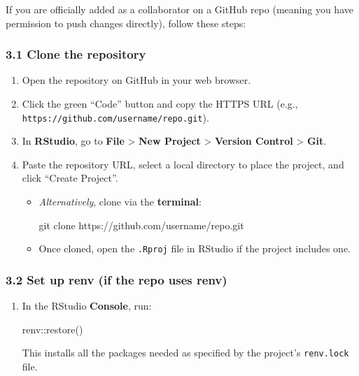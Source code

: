 \documentclass[
  letterpaper,
  DIV=11,
  numbers=noendperiod]{scrartcl}
\newenvironment{Shaded}{\begin{snugshade}}{\end{snugshade}}
\newcommand{\FunctionTok}[1]{\textcolor[rgb]{0.28,0.35,0.67}{#1}}
\newcommand{\NormalTok}[1]{\textcolor[rgb]{0.00,0.23,0.31}{#1}}
\newcommand{\SpecialCharTok}[1]{\textcolor[rgb]{0.37,0.37,0.37}{#1}}
\begin{document}
If you are officially added as a collaborator on a GitHub repo (meaning
you have permission to push changes directly), follow these steps:

\subsubsection{3.1 Clone the repository}\label{clone-the-repository}

\begin{enumerate}
\def\labelenumi{\arabic{enumi}.}
\item
  Open the repository on GitHub in your web browser.\\
\item
  Click the green ``Code'' button and copy the HTTPS URL (e.g.,
  \texttt{https://github.com/username/repo.git}).
\item
  In \textbf{RStudio}, go to \textbf{File} \textgreater{} \textbf{New
  Project} \textgreater{} \textbf{Version Control} \textgreater{}
  \textbf{Git}.\\
\item
  Paste the repository URL, select a local directory to place the
  project, and click ``Create Project''.

  \begin{itemize}
  \item
    \emph{Alternatively}, clone via the \textbf{terminal}:

\begin{Shaded}
\begin{Highlighting}[]
\FunctionTok{git}\NormalTok{ clone https://github.com/username/repo.git}
\end{Highlighting}
\end{Shaded}
  \item
    Once cloned, open the \texttt{.Rproj} file in RStudio if the project
    includes one.
  \end{itemize}
\end{enumerate}

\subsubsection{3.2 Set up renv (if the repo uses
renv)}\label{set-up-renv-if-the-repo-uses-renv}

\begin{enumerate}
\def\labelenumi{\arabic{enumi}.}
\item
  In the RStudio \textbf{Console}, run:

\begin{Shaded}
\begin{Highlighting}[]
\NormalTok{renv}\SpecialCharTok{::}\FunctionTok{restore}\NormalTok{()}
\end{Highlighting}
\end{Shaded}

  This installs all the packages needed as specified by the project's
  \texttt{renv.lock} file.
\end{enumerate}
\end{document}
